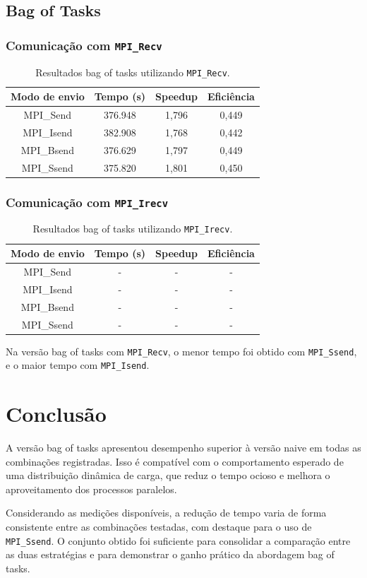 \documentclass[12pt,a4paper]{article}
\begin{document}
\subsection{Bag of Tasks}

\subsubsection{Comunicação com \texttt{MPI\_Recv}}
\begin{table}[H]
\centering
\begin{tabular}{|c|c|c|c|}
\hline
\textbf{Modo de envio} & \textbf{Tempo (s)} & \textbf{Speedup} & \textbf{Eficiência} \\
\hline
MPI\_Send & 376.948 & 1,796 & 0,449 \\
\hline
MPI\_Isend & 382.908 & 1,768 & 0,442 \\
\hline
MPI\_Bsend & 376.629 & 1,797 & 0,449 \\
\hline
MPI\_Ssend & 375.820 & 1,801 & 0,450 \\
\hline
\end{tabular}
\caption{Resultados bag of tasks utilizando \texttt{MPI\_Recv}.}
\end{table}

\subsubsection{Comunicação com \texttt{MPI\_Irecv}}
\begin{table}[H]
\centering
\begin{tabular}{|c|c|c|c|}
\hline
\textbf{Modo de envio} & \textbf{Tempo (s)} & \textbf{Speedup} & \textbf{Eficiência} \\
\hline
MPI\_Send & - & - & - \\
\hline
MPI\_Isend & - & - & - \\
\hline
MPI\_Bsend & - & - & - \\
\hline
MPI\_Ssend & - & - & - \\
\hline
\end{tabular}
\caption{Resultados bag of tasks utilizando \texttt{MPI\_Irecv}.}
\end{table}

Na versão bag of tasks com \texttt{MPI\_Recv}, o menor tempo foi obtido com \texttt{MPI\_Ssend}, e o maior tempo com \texttt{MPI\_Isend}.

\section{Conclusão}
A versão bag of tasks apresentou desempenho superior à versão naive em todas as combinações registradas. Isso é compatível com o comportamento esperado de uma distribuição dinâmica de carga, que reduz o tempo ocioso e melhora o aproveitamento dos processos paralelos.

Considerando as medições disponíveis, a redução de tempo varia de forma consistente entre as combinações testadas, com destaque para o uso de \texttt{MPI\_Ssend}. O conjunto obtido foi suficiente para consolidar a comparação entre as duas estratégias e para demonstrar o ganho prático da abordagem bag of tasks.
\end{document}
